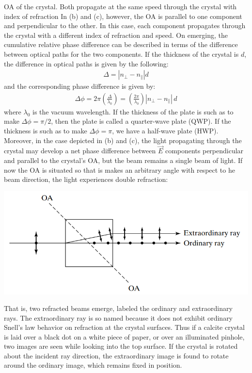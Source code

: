 \documentclass[11pt]{book}
\theoremstyle{break}
\theoremstyle{break}
\begin{document}
OA of the crystal. Both propagate at the same speed through the crystal with
index of refraction In (b) and (c), however, the OA is parallel to one
component and perpendicular to the other. In this case, each component
propagates through the crystal with a different index of refraction and speed.
On emerging, the cumulative relative phase difference can be described in
terms of the difference between optical paths for the two components. If the
thickness of the crystal is $d$, the difference in optical paths is given by the following:
\begin{align*}
\Delta = |n_\perp - n_{\parallel}|d
\end{align*}
and the corresponding phase difference is given by:
\begin{align*}
\Delta \phi = 2\pi \left( \frac{\Delta}{\lambda_0}\right) = \left( \frac{2\pi}{\lambda_0}\right) |n_{\perp} - n_{\parallel}| \, d
\end{align*}
where $\lambda_0$ is the vacuum wavelength. If the thickness of the plate is such as to make $\Delta \phi = \pi/2$, then the plate is called a quarter-wave plate (QWP). If the thickness is such as to make $\Delta \phi = \pi$, we have a half-wave plate (HWP). Moreover, in the case depicted in (b) and (c), the light propagating through the crystal may develop a net phase difference between $\vec{E}$ components perpendicular and parallel to the crystal's OA, but the beam remains a single beam of light. If now the OA is situated so that is makes an arbitrary angle with respect to he beam direction, the light experiences double refraction:
\begin{center}
\includegraphics[scale=0.65]{doubleRefrac}
\end{center}
That is, two refracted beams emerge, labeled the ordinary and extraordinary rays. The extraordinary ray is so named because it does not
exhibit ordinary Snell's law behavior on refraction at the crystal surfaces. Thus
if a calcite crystal is laid over a black dot on a white piece of paper, or over an illuminated pinhole, two images are seen while looking into the top surface. If the
crystal is rotated about the incident ray direction, the extraordinary image is
found to rotate around the ordinary image, which remains fixed in position. 
\end{document}
